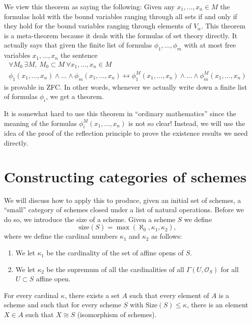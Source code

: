 \noindent
We view this theorem as saying the following: Given any
$x_1, \ldots, x_n \in M$ the formulas hold with the bound variables ranging
through all sets if and only if they hold for the bound variables ranging
through elements of $V_\alpha$. This theorem is a meta-theorem because 
it deals with the formulas of set theory directly.
It actually says that given the finite list of formulas
$\phi_1, \ldots, \phi_m$ with at most free variables $x_1, \ldots, x_n$
the sentence
$$
\begin{matrix}
\forall M_0\ \exists M, \ M_0 \subset M\ \forall x_1, \ldots, x_n \in M \\
\phi_1(x_1, \ldots, x_n) \wedge \ldots \wedge \phi_m(x_1, \ldots, x_n)
\leftrightarrow
\phi_1^M(x_1, \ldots, x_n) \wedge \ldots \wedge \phi_m^M(x_1, \ldots, x_n)
\end{matrix}
$$
is provable in ZFC. In other words, whenever we actually write down
a finite list of formulas $\phi_i$, we get a theorem.

\medskip\noindent
It is somewhat hard to use this theorem in ``ordinary mathematics''
since the meaning of the formulas $\phi_i^M(x_1, \ldots, x_n)$
is not so clear! Instead, we will use the idea of the proof of the
reflection principle to prove the existence results we need directly.

\section{Constructing categories of schemes}
\label{section-categories-schemes}

\noindent
We will discuss how to apply this to produce, given an initial
set of schemes, a ``small'' category of schemes closed under
a list of natural operations. Before we do so, we introduce the
size of a scheme. Given a scheme $S$ we define
$$
\text{size}(S) = \max(\aleph_0, \kappa_1, \kappa_2),
$$
where we define the cardinal numbers $\kappa_1$ and $\kappa_2$ as follows:
\begin{enumerate}
\item We let $\kappa_1$ be the cardinality of the set of affine opens of $S$.
\item We let $\kappa_2$ be the supremum of all the cardinalities of
all $\Gamma(U, \mathcal{O}_S)$ for all $U \subset S$ affine open.
\end{enumerate}

\begin{lemma}
\label{lemma-bounded-size}
For every cardinal $\kappa$, there exists a set $A$ such
that every element of $A$ is a scheme and such that for every
scheme $S$ with $\text{Size}(S) \leq \kappa$, there is
an element $X \in A$ such that $X \cong S$ (isomorphism
of schemes).
\end{lemma}

